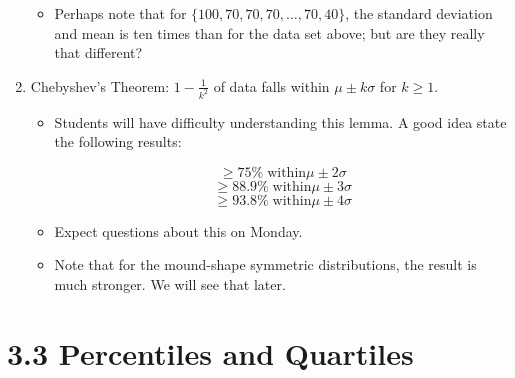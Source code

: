 \documentclass{article}
\begin{document}
\begin{enumerate}
        \begin{itemize}
        
            \item Perhaps note that for $\{100, 70, 70, 70,\ldots,70, 40\}$, the standard deviation and mean is ten times than for the data set above; but are they really that different?
            
        \end{itemize}

    \item Chebyshev's Theorem: $1-\frac{1}{k^2}$ of data falls within $\mu\pm k \sigma$ for $k\geq 1$.
        
        \begin{itemize}
        
        \item Students will have difficulty understanding this lemma. A good idea state the following results:
        
        $$\geq 75\%\;\mbox{within} \mu \pm 2\sigma$$
        $$\geq 88.9\%\;\mbox{within} \mu \pm 3\sigma$$
        $$\geq 93.8\%\;\mbox{within} \mu \pm 4\sigma$$
        
        \item Expect questions about this on Monday.
        
        \item Note that for the mound-shape symmetric distributions, the result is much stronger. We will see that later.

        \end{itemize}

\end{enumerate}

\section*{3.3 Percentiles and Quartiles}
\end{document}
